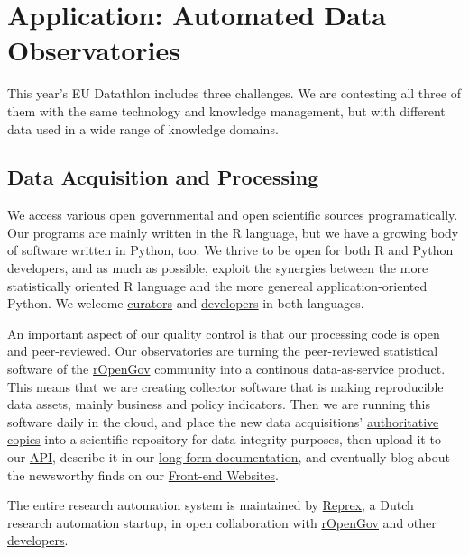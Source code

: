 \documentclass[
  a4paper,
  openany, a4paper, oneside]{book}
\begin{document}
\hypertarget{app}{%
\chapter{Application: Automated Data Observatories}\label{app}}

This year's EU Datathlon includes three challenges. We are contesting all three of them with the same technology and knowledge management, but with different data used in a wide range of knowledge domains.

\hypertarget{data-acquisition-and-processing}{%
\section{Data Acquisition and Processing}\label{data-acquisition-and-processing}}

We access various open governmental and open scientific sources programatically. Our programs are mainly written in the R language, but we have a growing body of software written in Python, too. We thrive to be open for both R and Python developers, and as much as possible, exploit the synergies between the more statistically oriented R language and the more genereal application-oriented Python. We welcome \href{https://economy.dataobservatory.eu/authors/curator/}{curators} and \href{https://greendeal.dataobservatory.eu/authors/developer/}{developers} in both languages.

An important aspect of our quality control is that our processing code is open and peer-reviewed. Our observatories are turning the peer-reviewed statistical software of the \href{http://ropengov.org/}{rOpenGov} community into a continous data-as-service product. This means that we are creating collector software that is making reproducible data assets, mainly business and policy indicators. Then we are running this software daily in the cloud, and place the new data acquisitions' \protect\hyperlink{zenodo}{authoritative copies} into a scientific repository for data integrity purposes, then upload it to our \protect\hyperlink{api}{API}, describe it in our \protect\hyperlink{bookdown}{long form documentation}, and eventually blog about the newsworthy finds on our \protect\hyperlink{hugo}{Front-end Websites}.

The entire research automation system is maintained by \href{https://reprex.nl/}{Reprex}, a Dutch research automation startup, in open collaboration with \href{http://ropengov.org/}{rOpenGov} and other \href{https://greendeal.dataobservatory.eu/\#contributors}{developers}.
\end{document}
